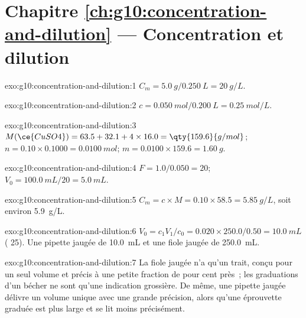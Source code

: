 \section*{Chapitre \ref{ch:g10:concentration-and-dilution} --- Concentration et dilution}

\begin{solution}{exo:g10:concentration-and-dilution:1}
$C_m = \qty{5.0}{g} / \qty{0.250}{L} = \qty{20}{g/L}$.
\end{solution}

\begin{solution}{exo:g10:concentration-and-dilution:2}
$c = \qty{0.050}{mol} / \qty{0.200}{L} = \qty{0.25}{mol/L}$.
\end{solution}

\begin{solution}{exo:g10:concentration-and-dilution:3}
$M(\ce{CuSO4}) = 63.5 + 32.1 + 4 \times 16.0 = \qty{159.6}{g/mol}$;
$n = 0.10 \times 0.1000 = \qty{0.0100}{mol}$; $m = 0.0100 \times 159.6 =
\qty{1.60}{g}$.
\end{solution}

\begin{solution}{exo:g10:concentration-and-dilution:4}
$F = 1.0 / 0.050 = 20$; $V_0 = \qty{100.0}{mL} / 20 = \qty{5.0}{mL}$.
\end{solution}

\begin{solution}{exo:g10:concentration-and-dilution:5}
$C_m = c \times M = 0.10 \times 58.5 = \qty{5.85}{g/L}$, soit environ
\qty{5.9}{g/L}.
\end{solution}

\begin{solution}{exo:g10:concentration-and-dilution:6}
$V_0 = c_1 V_1 / c_0 = 0.020 \times 250.0 / 0.50 = \qty{10.0}{mL}$
( 25). Une pipette jaugée de \qty{10.0}{mL} et une
fiole jaugée de \qty{250.0}{mL}.
\end{solution}

\begin{solution}{exo:g10:concentration-and-dilution:7}
La fiole jaugée n'a qu'un trait, conçu pour un seul volume et précis à
une petite fraction de pour cent près~; les graduations d'un bécher ne
sont qu'une indication grossière. De même, une pipette jaugée délivre un
volume unique avec une grande précision, alors qu'une éprouvette graduée
est plus large et se lit moins précisément.
\end{solution}


